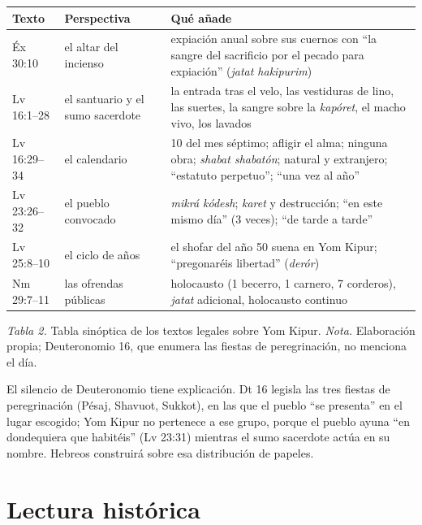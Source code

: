 \documentclass[11pt,letterpaper]{article}
\begin{document}
\begin{center}\small\renewcommand{\arraystretch}{1.2}
\begin{tabular}{@{}L{2.2cm}L{4.4cm}L{8.2cm}@{}}
\toprule
\textbf{Texto} & \textbf{Perspectiva} & \textbf{Qué añade} \\ \midrule
Éx 30:10 & el altar del incienso & expiación anual sobre sus cuernos con ``la sangre del sacrificio por el pecado para expiación'' (\emph{jatat hakipurim}) \\
Lv 16:1--28 & el santuario y el sumo sacerdote & la entrada tras el velo, las vestiduras de lino, las suertes, la sangre sobre la \emph{kapóret}, el macho vivo, los lavados \\
Lv 16:29--34 & el calendario & 10 del mes séptimo; afligir el alma; ninguna obra; \emph{shabat shabatón}; natural y extranjero; ``estatuto perpetuo''; ``una vez al año'' \\
Lv 23:26--32 & el pueblo convocado & \emph{mikrá kódesh}; \emph{karet} y destrucción; ``en este mismo día'' (3 veces); ``de tarde a tarde'' \\
Lv 25:8--10 & el ciclo de años & el shofar del año 50 suena en Yom Kipur; ``pregonaréis libertad'' (\emph{derór}) \\
Nm 29:7--11 & las ofrendas públicas & holocausto (1 becerro, 1 carnero, 7 corderos), \emph{jatat} adicional, holocausto continuo \\
\bottomrule
\end{tabular}\par
{\footnotesize\color{sepia}\textit{Tabla 2.} Tabla sinóptica de los textos legales sobre Yom Kipur. \textit{Nota.} Elaboración propia; Deuteronomio 16, que enumera las fiestas de peregrinación, no menciona el día.}
\end{center}

El silencio de Deuteronomio tiene explicación. Dt 16 legisla las tres fiestas de peregrinación (Pésaj, Shavuot, Sukkot), en las que el pueblo ``se presenta'' en el lugar escogido; Yom Kipur no pertenece a ese grupo, porque el pueblo ayuna ``en dondequiera que habitéis'' (Lv 23:31) mientras el sumo sacerdote actúa en su nombre. Hebreos construirá sobre esa distribución de papeles.

\section{Lectura histórica}
\end{document}
